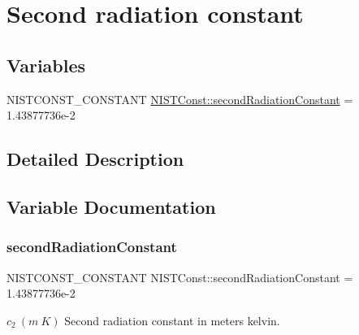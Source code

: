 \hypertarget{group___n_i_s_t_const-_second_radiation_constant}{}\section{Second radiation constant}
\label{group___n_i_s_t_const-_second_radiation_constant}
\subsection*{Variables}
\begin{DoxyCompactItemize}
\item 
N\+I\+S\+T\+C\+O\+N\+S\+T\+\_\+\+C\+O\+N\+S\+T\+A\+NT \mbox{\hyperlink{group___n_i_s_t_const-_second_radiation_constant_ga74b8e08fa5ed49bad92104db721dffcb}{N\+I\+S\+T\+Const\+::second\+Radiation\+Constant}} = 1.\+43877736e-\/2
\end{DoxyCompactItemize}


\subsection{Detailed Description}


\subsection{Variable Documentation}
\mbox{\label{group___n_i_s_t_const-_second_radiation_constant_ga74b8e08fa5ed49bad92104db721dffcb}} 
\subsubsection{\texorpdfstring{second\+Radiation\+Constant}{secondRadiationConstant}}
{\footnotesize\ttfamily N\+I\+S\+T\+C\+O\+N\+S\+T\+\_\+\+C\+O\+N\+S\+T\+A\+NT N\+I\+S\+T\+Const\+::second\+Radiation\+Constant = 1.\+43877736e-\/2}

$c_2 \ (m\ K)$ Second radiation constant in meters kelvin. 